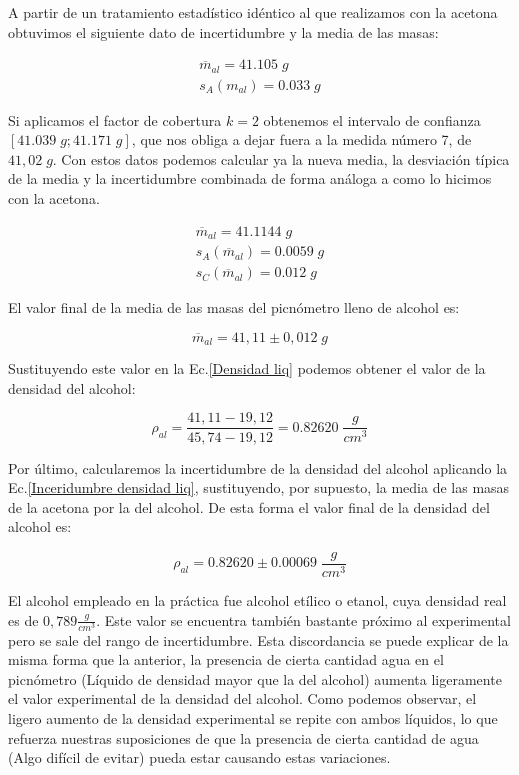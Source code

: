 \documentclass[a4paper,12pt,titlepage]{article}
\begin{document}
A partir de un tratamiento estadístico idéntico al que realizamos con la acetona obtuvimos el siguiente dato de incertidumbre y la media de las masas:

\begin{gather}
    \overline{m}_{al} = 41.105 \; g \\
    s_{A}(m_{al}) =  0.033 \; g 
\end{gather}

Si aplicamos el factor de cobertura $k=2$ obtenemos el intervalo de confianza $[41.039 \; g ; 41.171 \; g]$, que nos obliga a dejar fuera a la medida número 7, de $41,02 \;g$. Con estos datos podemos calcular ya la nueva media, la desviación típica de la media y la incertidumbre combinada de forma análoga a como lo hicimos con la acetona.

\begin{gather}
    \overline{m}_{al} = 41.1144 \; g\\
    s_{A}(\overline{m}_{al}) = 0.0059 \; g\\
    s_{C}(\overline{m}_{al}) = 0.012 \; g
\end{gather}

El valor final de la media de las masas del picnómetro lleno de alcohol es:

\begin{equation}
    \overline{m}_{al} = 41,11 \pm 0,012 \; g
\end{equation}

Sustituyendo este valor en la Ec.\ref{Densidad liq} podemos obtener el valor de la densidad del alcohol:

\begin{equation}
    \rho_{al} = \frac{41,11-19,12}{45,74-19,12} = 0.82620 \; \frac{g}{cm^3}
\end{equation}

Por último, calcularemos la incertidumbre de la densidad del alcohol aplicando la Ec.\ref{Inceridumbre densidad liq}, sustituyendo, por supuesto, la media de las masas de la acetona por la del alcohol. De esta forma el valor final de la densidad del alcohol es:

\begin{equation}
    \rho_{al} = 0.82620 \pm 0.00069 \; \frac{g}{cm^3}
\end{equation}

El alcohol empleado en la práctica fue alcohol etílico o etanol, cuya densidad real es de $0,789 \frac{g}{cm^3}$. Este valor se encuentra también bastante próximo al experimental pero se sale del rango de incertidumbre. Esta discordancia se puede explicar de la misma forma que la anterior, la presencia de cierta cantidad agua en el picnómetro (Líquido de densidad mayor que la del alcohol) aumenta ligeramente el valor experimental de la densidad del alcohol. Como podemos observar, el ligero aumento de la densidad experimental se repite con ambos líquidos, lo que refuerza nuestras suposiciones de que la presencia de cierta cantidad de agua (Algo difícil de evitar) pueda estar causando estas variaciones.
\end{document}
